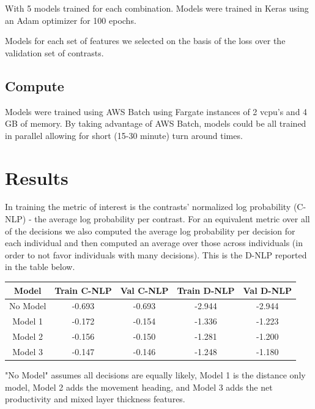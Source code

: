 \documentclass[11pt]{article}
\begin{document}
With 5 models trained for each combination. Models were trained in Keras using an Adam optimizer for 100 epochs. 

Models for each set of features we selected on the basis of the loss over the validation set of contrasts. 

\subsection*{Compute}

Models were trained using AWS Batch using Fargate instances of 2 vcpu's and 4 GB of memory. By taking advantage of AWS Batch,  models could be all trained in parallel allowing for short (15-30 minute) turn around times. 

\section*{Results}

In training the metric of interest is the contrasts' normalized log probability (C-NLP) - the average log probability per contrast. For an equivalent metric over all of the decisions we also computed the average log probability per decision for each individual and then computed an average over those across individuals (in order to not favor individuals with many decisions). This is the D-NLP reported in the table below. 

\begin{center}
\begin{tabular}{| c | c | c | c | c |}
\hline 
Model & Train C-NLP & Val C-NLP & Train D-NLP & Val D-NLP \\
\hline
No Model & -0.693 & -0.693 & -2.944 & -2.944 \\
Model 1 & -0.172 & -0.154 & -1.336 & -1.223 \\
Model 2 & -0.156 & -0.150 & -1.281 & -1.200 \\
Model 3 & -0.147 & -0.146 & -1.248 & -1.180 \\
\hline
\end{tabular}
\end{center}

"No Model" assumes all decisions are equally likely, Model 1 is the distance only model, Model 2 adds the movement heading, and Model 3 adds the net productivity and mixed layer thickness features. \newline
\end{document}
